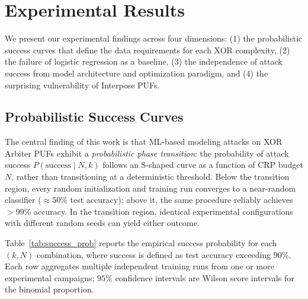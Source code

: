 \section{Experimental Results}
\label{sec:results}

We present our experimental findings across four dimensions: (1) the probabilistic
success curves that define the data requirements for each XOR complexity,
(2) the failure of logistic regression as a baseline, (3) the independence of
attack success from model architecture and optimization paradigm, and (4) the
surprising vulnerability of Interpose PUFs.

\subsection{Probabilistic Success Curves}
\label{sec:success_curves}

The central finding of this work is that ML-based modeling attacks on XOR
Arbiter PUFs exhibit a \emph{probabilistic phase transition}: the probability
of attack success $P(\text{success} \mid N, k)$ follows an S-shaped curve as a
function of CRP budget $N$, rather than transitioning at a deterministic
threshold.  Below the transition region, every random initialization and
training run converges to a near-random classifier ($\approx 50\%$ test
accuracy); above it, the same procedure reliably achieves $> 99\%$ accuracy.
In the transition region, identical experimental configurations with different random
seeds can yield either outcome.

Table~\ref{tab:success_prob} reports the empirical success probability for
each $(k, N)$ combination, where success is defined as test accuracy exceeding
$90\%$.  Each row aggregates multiple independent training runs from one or
more experimental campaigns; $95\%$ confidence intervals are Wilson score
intervals for the binomial proportion.


